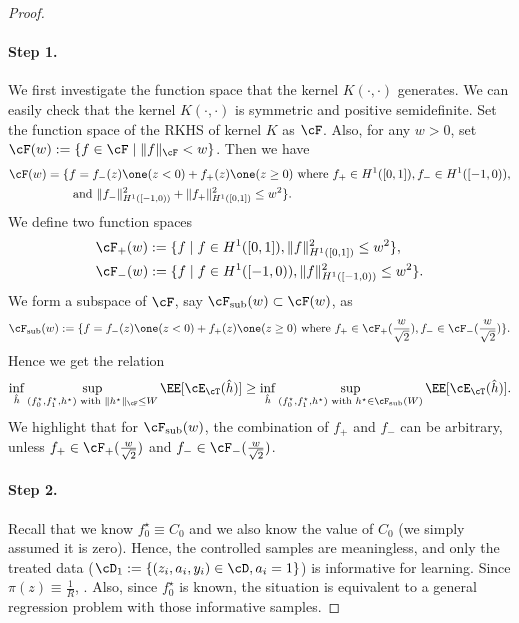 \documentclass[12pt,a4paper,pdftex,onepage]{article}
\begin{document}
\begin{proof}
\paragraph{Step 1. }
We first investigate the function space that the kernel \(K(\cdot,\cdot)\) generates.
We can easily check that the kernel \(K(\cdot, \cdot)\) is symmetric and positive semidefinite.
Set the function space of the RKHS of kernel \(K\) as \(\cF\).
Also, for any \(w>0\), set \(\cF(w) := \{f \in \cF \mid \| f \|_\cF <w\}\).
Then we have
\begin{align}\label{equation; kernel for lower bound}
\cF(w) = \{&f = f_-(z)\one(z< 0) + f_+(z)\one(z \geq 0) \text{ where } f_+ \in H^1([0,1]), f_- \in H^1([-1,0)), \nonumber \\ 
&
\text{ and } 
\|f_- \|^2_{H^1([-1,0))} +  \|f_+ \|_{H^1([0,1])}^2 \leq  w^2\}.
\end{align}
We define two function spaces 
\begin{align*}
&  \cF_+(w) := \{ f \mid  f \in H^1([0,1]),  \|f\|_{H^1([0,1])}^2 \leq w^2\},\\
&  \cF_-(w) := \{ f \mid f \in H^1([-1,0)),   \|f\|_{H^1([-1,0))}^2 \leq w^2\}.
\end{align*}
We form a subspace of \(\cF\), say \(\cF_{\operatorname{sub}}(w) \subset \cF(w)\), as 
\begin{align*}
\cF_{\operatorname{sub}}(w) := \{f = f_-(z)\one(z < 0) + f_+(z)\one(z \geq 0)  \text{ where } f_+ \in \cF_+(\frac{w}{\sqrt{2}}), f_- \in \cF_-(\frac{w}{\sqrt{2}}) \}.
\end{align*}
Hence we get the relation 
\begin{align*}
\inf_{\hat{h}} \sup_{(f_0^\star, f_1^\star, h^\star )\text{ with } \|h^\star\|_\cF \leq W} \EE[\cE_\cT(\hat{h})] \geq   \inf_{\hat{h}} \sup_{(f_0^\star, f_1^\star, h^\star )\text{ with } h^\star \in \cF_{\operatorname{sub}}(W)} \EE[\cE_\cT(\hat{h})].
\end{align*}
We highlight that for \(\cF_{\operatorname{sub}}(w)\), the combination of \(f_+\) and \(f_-\) can be arbitrary, unless \(f_+ \in \cF_+(\frac{w}{\sqrt{2}})\) and \(f_- \in \cF_-(\frac{w}{\sqrt{2}})\).

\paragraph{Step 2. }
Recall that we know \(f_0^\star \equiv C_0\) and we also know the value of \(C_0\) (we simply assumed it is zero).
Hence, the controlled samples are meaningless, and only the treated data (\(\cD_1:=\{(z_i,a_i, y_i) \in \cD, a_i=1 \}\)) is informative for learning.
Since \(\pi(z) \equiv \frac{1}{R}\), .
Also, since \(f_0^\star\) is known, the situation is equivalent to a general regression problem with those informative samples.


\end{proof}
\end{document}
